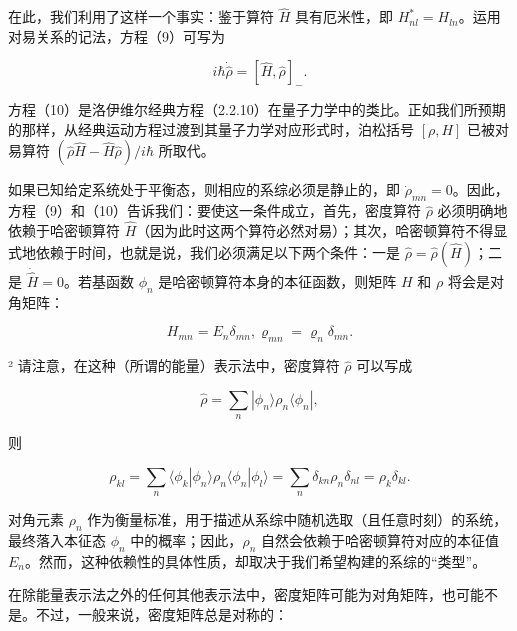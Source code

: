 在此，我们利用了这样一个事实：鉴于算符 \(\hat{H}\) 具有厄米性，即 \(H_{nl}^{*}=H_{ln}\)。运用对易关系的记法，方程（9）可写为

\begin{equation}\tag{5.1.10}\label{eq:5.1.10}
i \hbar \dot { \hat { \rho } } = [ \hat { H } , \hat { \rho } ] _ { - } .
\end{equation}

方程（10）是洛伊维尔经典方程（2.2.10）在量子力学中的类比。正如我们所预期的那样，从经典运动方程过渡到其量子力学对应形式时，泊松括号 \([\rho,H]\) 已被对易算符 \((\hat{\rho}\hat{H}-\hat{H}\hat{\rho})/i\hbar\) 所取代。

如果已知给定系统处于平衡态，则相应的系综必须是静止的，即 \(\dot{\rho}_{mn}=0\)。因此，方程（9）和（10）告诉我们：要使这一条件成立，首先，密度算符 \(\hat{\rho}\) 必须明确地依赖于哈密顿算符 \(\hat{H}\)（因为此时这两个算符必然对易）；其次，哈密顿算符不得显式地依赖于时间，也就是说，我们必须满足以下两个条件：一是 \(\hat{\rho}=\hat{\rho}(\hat{H})\)；二是 \(\dot{\hat{H}}=0\)。若基函数 \(\phi_{n}\) 是哈密顿算符本身的本征函数，则矩阵 \(H\) 和 \(\rho\) 将会是对角矩阵：

\begin{equation}\tag{5.1.11}\label{eq:5.1.11}
H _ { m n } = E _ { n } \delta _ { m n } ,  \varrho _ { m n } = \varrho _ { n } \delta _ { m n } .
\end{equation}

² 请注意，在这种（所谓的能量）表示法中，密度算符 \(\hat{\rho}\) 可以写成

\begin{equation}\tag{5.1.12}\label{eq:5.1.12}
\hat { \rho } = \sum _ { n } | \phi _ { n } \rangle \rho _ { n } \langle \phi _ { n } | ,
\end{equation}

则

\begin{equation}\tag{5.1.13}\label{eq:5.1.13}
\rho _ { k l } = \sum _ { n } \langle \phi _ { k } | \phi _ { n } \rangle \rho _ { n } \langle \phi _ { n } | \phi _ { l } \rangle = \sum _ { n } \delta _ { k n } \rho _ { n } \delta _ { n l } = \rho _ { k } \delta _ { k l } .
\end{equation}

对角元素 \(\rho_{n}\) 作为衡量标准，用于描述从系综中随机选取（且任意时刻）的系统，最终落入本征态 \(\phi_{n}\) 中的概率；因此，\(\rho_{n}\) 自然会依赖于哈密顿算符对应的本征值 \(E_{n}\)。然而，这种依赖性的具体性质，却取决于我们希望构建的系综的``类型''。

在除能量表示法之外的任何其他表示法中，密度矩阵可能为对角矩阵，也可能不是。不过，一般来说，密度矩阵总是对称的：

